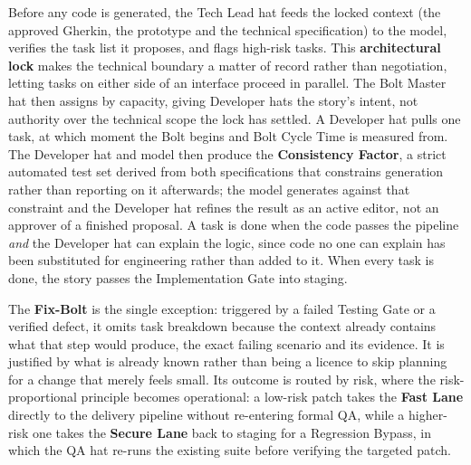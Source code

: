 Before any code is generated, the Tech Lead hat feeds the locked context (the approved Gherkin, the prototype and the technical specification) to the model, verifies the task list it proposes, and flags high-risk tasks. This \textbf{architectural lock} makes the technical boundary a matter of record rather than negotiation, letting tasks on either side of an interface proceed in parallel. The Bolt Master hat then assigns by capacity, giving Developer hats the story's intent, not authority over the technical scope the lock has settled. A Developer hat pulls one task, at which moment the Bolt begins and Bolt Cycle Time is measured from. The Developer hat and model then produce the \textbf{Consistency Factor}, a strict automated test set derived from both specifications that constrains generation rather than reporting on it afterwards; the model generates against that constraint and the Developer hat refines the result as an active editor, not an approver of a finished proposal. A task is done when the code passes the pipeline \emph{and} the Developer hat can explain the logic, since code no one can explain has been substituted for engineering rather than added to it. When every task is done, the story passes the Implementation Gate into staging.

The \textbf{Fix-Bolt} is the single exception: triggered by a failed Testing Gate or a verified defect, it omits task breakdown because the context already contains what that step would produce, the exact failing scenario and its evidence. It is justified by what is already known rather than being a licence to skip planning for a change that merely feels small. Its outcome is routed by risk, where the risk-proportional principle becomes operational: a low-risk patch takes the \textbf{Fast Lane} directly to the delivery pipeline without re-entering formal \ac{QA}, while a higher-risk one takes the \textbf{Secure Lane} back to staging for a Regression Bypass, in which the \ac{QA} hat re-runs the existing suite before verifying the targeted patch.

